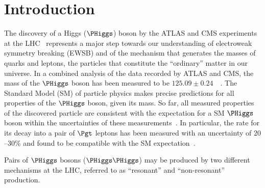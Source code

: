 \section{Introduction}
\label{sec:introduction}

The discovery of a Higgs ($\PHiggs$) boson by the ATLAS and CMS experiments at the LHC~\cite{Higgs-Discovery_CMS,Higgs-Discovery_ATLAS}
represents a major step towards our understanding of electroweak symmetry breaking (EWSB) 
and of the mechanism that generates the masses of quarks and leptons, the particles that constitute the ``ordinary'' matter in our universe.
In a combined analysis of the data recorded by ATLAS and CMS, 
the mass of the $\PHiggs$ boson has been measured to be $125.09 \pm 0.24$~\GeV~\cite{HIG-14-042}.
The Standard Model (SM) of particle physics makes precise predictions for all properties of the $\PHiggs$ boson, given its mass.
So far, all measured properties of the discovered particle are consistent with the expectation for a SM $\PHiggs$ boson within the uncertainties of these measurements~\cite{HIG-15-002}.
In particular, the rate for its decay into a pair of $\Pgt$ leptons has been measured with an uncertainty of $20$--$30\%$
and found to be compatible with the SM expectation~\cite{HIG-13-004,Aad:2015vsa,HIG-15-002,HIG-16-043,ATLAS:2018lur}.

Pairs of $\PHiggs$ bosons ($\PHiggs\PHiggs$) may be produced by two different mechanisms at the LHC,
referred to as ``resonant'' and ``non-resonant'' production.

